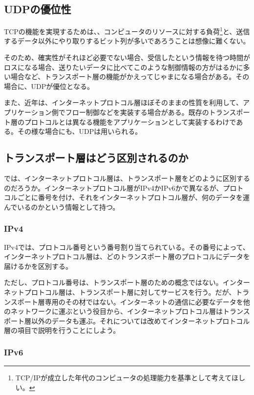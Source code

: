 \subsection{UDPの優位性}

TCPの機能を実現するためは、、コンピュータのリソースに対する負荷\footnote{TCP/IPが成立した年代のコンピュータの処理能力を基準として考えてほしい。}と、送信するデータ以外にやり取りするビット列が多いであろうことは想像に難くない。

そのため、確実性がそれほど必要でない場合、受信したという情報を待つ時間がロスになる場合、送りたいデータに比べてこのような制御情報の方がはるかに多い場合など、トランスポート層の機能がかえってじゃまになる場合がある。その場合に、UDPが優位となる。

また、近年は、インターネットプロトコル層ほぼそのままの性質を利用して、アプリケーション側でフロー制御などを実装する場合がある。既存のトランスポート層のプロトコルとは異なる機能をアプリケーションとして実装するわけである。その様な場合にも、UDPは用いられる。

\subsection{トランスポート層はどう区別されるのか}

では、インターネットプロトコル層は、トランスポート層をどのように区別するのだろうか。インターネットプロトコル層がIPv4かIPv6かで異なるが、プロトコルごとに番号を付け、それをインターネットプロトコル層が、何のデータを運んでいるのかという情報として持つ。


\subsubsection{IPv4}

IPv4では、プロトコル番号という番号割り当てられている。その番号によって、インターネットプロトコル層は、どのトランスポート層のプロトコルにデータを届けるかを区別する。

ただし、プロトコル番号は、トランスポート層のための概念ではない。インターネットプロトコル層は、トランスポート層に対してサービスを行う。だが、トランスポート層専用のその材ではない。インターネットの通信に必要なデータを他のネットワークに運ぶという役目から、インターネットプロトコル層はトランスポート層以外のデータも運ぶ。それについては改めてインターネットプロトコル層の項目で説明を行うことにしよう。

\subsubsection{IPv6}

